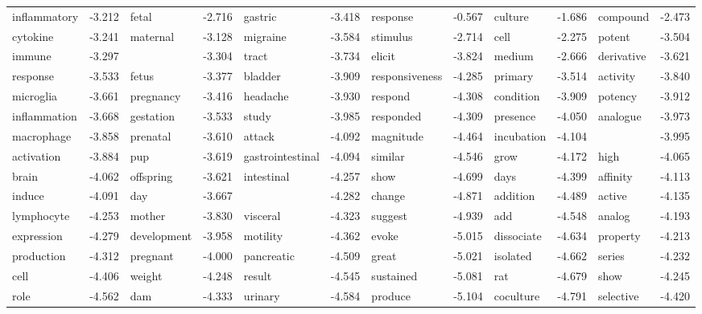 \documentclass{article}
\begin{document}
\begin{table}
{\begin{tabular}{|l r|l r|l r|l r|l r|l r|}
inflammatory & -3.212 & fetal & -2.716 & gastric & -3.418 & response & -0.567 & culture & -1.686 & compound & -2.473\\
cytokine & -3.241 & maternal & -3.128 & migraine & -3.584 & stimulus & -2.714 & cell & -2.275 & potent & -3.504\\
immune & -3.297 &  & -3.304 & tract & -3.734 & elicit & -3.824 & medium & -2.666 & derivative & -3.621\\
response & -3.533 & fetus & -3.377 & bladder & -3.909 & responsiveness & -4.285 & primary & -3.514 & activity & -3.840\\
microglia & -3.661 & pregnancy & -3.416 & headache & -3.930 & respond & -4.308 & condition & -3.909 & potency & -3.912\\
inflammation & -3.668 & gestation & -3.533 & study & -3.985 & responded & -4.309 & presence & -4.050 & analogue & -3.973\\
macrophage & -3.858 & prenatal & -3.610 & attack & -4.092 & magnitude & -4.464 & incubation & -4.104 &  & -3.995\\
activation & -3.884 & pup & -3.619 & gastrointestinal & -4.094 & similar & -4.546 & grow & -4.172 & high & -4.065\\
brain & -4.062 & offspring & -3.621 & intestinal & -4.257 & show & -4.699 & days & -4.399 & affinity & -4.113\\
induce & -4.091 & day & -3.667 &  & -4.282 & change & -4.871 & addition & -4.489 & active & -4.135\\
lymphocyte & -4.253 & mother & -3.830 & visceral & -4.323 & suggest & -4.939 & add & -4.548 & analog & -4.193\\
expression & -4.279 & development & -3.958 & motility & -4.362 & evoke & -5.015 & dissociate & -4.634 & property & -4.213\\
production & -4.312 & pregnant & -4.000 & pancreatic & -4.509 & great & -5.021 & isolated & -4.662 & series & -4.232\\
cell & -4.406 & weight & -4.248 & result & -4.545 & sustained & -5.081 & rat & -4.679 & show & -4.245\\
role & -4.562 & dam & -4.333 & urinary & -4.584 & produce & -5.104 & coculture & -4.791 & selective & -4.420\\
\hline
\end{tabular}
}
\end{table}
\end{document}
